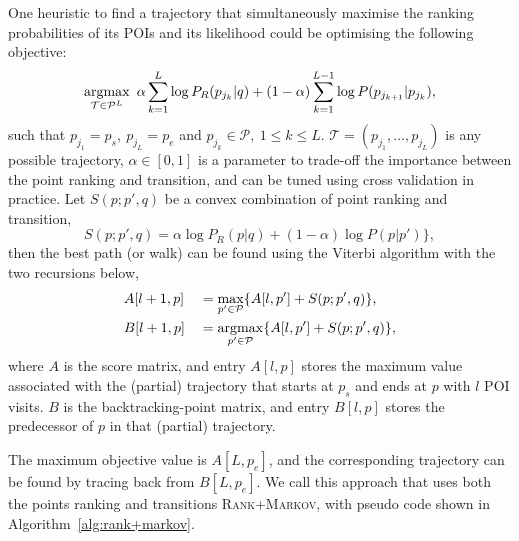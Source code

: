 One heuristic to find a trajectory that simultaneously maximise the ranking probabilities of its POIs and its likelihood 
could be optimising the following objective:
\begin{equation*}
    \operatorname*{argmax}_{\mathcal{T} \in \mathcal{P}^L} ~\alpha \sum_{k=1}^{L} \log P_R(p_{j_k} | q) +
                                     (1-\alpha) \sum_{k=1}^{L-1} \log P(p_{j_{k+1}} | p_{j_k}),
\end{equation*}
such that
$p_{j_1} = p_s, ~ p_{j_L} = p_e$ and
$p_{j_k} \in \mathcal{P}, ~1 \le k \le L$.
$\mathcal{T} = (p_{j_1}, \dots, p_{j_L})$ is any possible trajectory,
$\alpha \in [0, 1]$ is a parameter to trade-off the importance between the point ranking and transition, 
and can be tuned using cross validation in practice.
Let $S(p; p', q)$ be a convex combination of point ranking and transition,
\begin{equation*}
    S(p; p', q)  = \alpha \log P_R(p|q) + (1-\alpha) \log P(p|p') \},
\end{equation*}
then the best path (or walk) can be found using the Viterbi algorithm with the two recursions below,
\begin{alignat}{2}
&A[l+1, p]   &&= \max_{p' \in \mathcal{P}} \{ A[l, p'] + S(p; p', q) \}, \label{eq:max} \\
&B[l+1, p]   &&= \operatorname*{argmax}_{p' \in \mathcal{P}} \{ A[l, p'] + S(p; p', q) \}, \label{eq:argmax}
\end{alignat}
where $A$ is the score matrix, and entry $A[l, p]$ stores the maximum value associated with the (partial) trajectory
that starts at $p_s$ and ends at $p$ with $l$ POI visits.
$B$ is the backtracking-point matrix, and entry $B[l, p]$ stores the predecessor of $p$ in that (partial) trajectory.

The maximum objective value is $A[L, p_e]$,
and the corresponding trajectory can be found by tracing back from $B[L, p_e]$.
We call this approach that uses both the points ranking and transitions \textsc{Rank+Markov},
with pseudo code shown in Algorithm~\ref{alg:rank+markov}.


